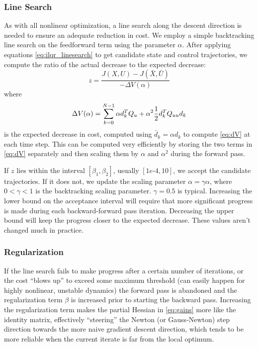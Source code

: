 \documentclass[../root.tex]{subfiles}
\begin{document}
    \subsubsection{Line Search} As with all nonlinear optimization, a line
    search along the descent direction is needed to ensure an adequate
    reduction in cost. We employ a simple backtracking line search on the
    feedforward term using the parameter $\alpha$. After applying equations
    \eqref{eq:ilqr_linesearch} to get candidate state
    and control trajectories, we compute the ratio of the actual decrease to
    the expected decrease:
    \begin{equation} \label{eq:ilqr_z}
        z = \frac{J(X,U) - J(\bar{X},\bar{U})}{-\Delta V(\alpha)}
    \end{equation}
    where
    \begin{equation}
        \Delta V(\alpha) = \sum_{k=0}^{N-1} \alpha d_k^T Q_u + \alpha^2 \frac{1}{2} d_k^T Q_{uu} d_k
    \end{equation}
    is the expected decrease in cost, computed using $\bar{d}_k =
    \alpha d_k$ to compute \eqref{eq:dV} at each time step. This can be
    computed very efficiently by storing the two terms in
    \eqref{eq:dV} separately and then scaling them by $\alpha$ and $\alpha^2$
    during the forward pass.

    If $z$ lies within the interval $[\beta_1, \beta_2]$, usually
    $[1e\text{-}4,10]$, we accept the candidate trajectories. If it does not,
    we update the scaling parameter $\alpha = \gamma \alpha$, where $0 <
    \gamma < 1$ is the backtracking scaling parameter. $\gamma = 0.5$ is
    typical. Increasing the lower bound on the acceptance interval will
    require that more significant progress is made during each
    backward-forward pass iteration. Decreasing the upper bound will keep the
    progress closer to the expected decrease. These values aren't changed
    much in practice.

    \subsubsection{Regularization} If the line search fails to make progress
    after a certain number of iterations, or the cost ``blows up'' to exceed
    some maximum threshold (can easily happen for highly nonlinear, unstable
    dynamics) the forward pass is abandoned and the regularization term
    $\beta$ is increased prior to starting the backward pass. Increasing the
    regularization term makes the partial Hessian in
    \eqref{eq:gains} more like the identity matrix, effectively ``steering''
    the Newton (or Gauss-Newton) step direction towards the more naive
    gradient descent direction, which tends to be more reliable when the
    current iterate is far from the local optimum.
\end{document}
